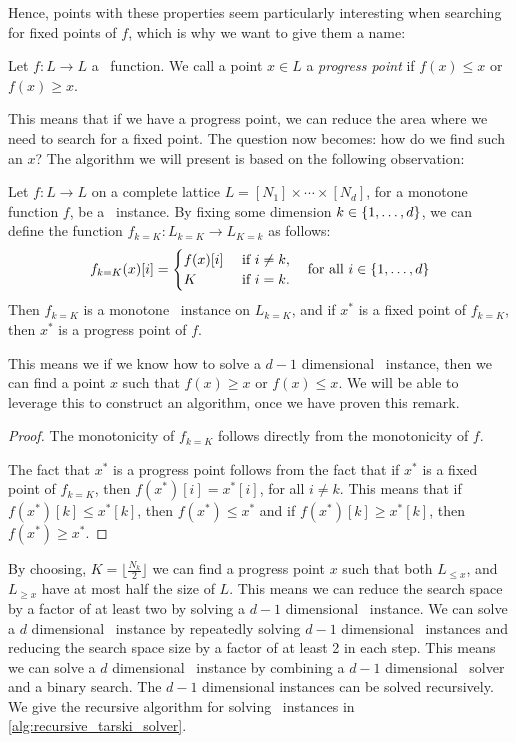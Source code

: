 Hence, points with these properties seem particularly interesting when searching for fixed points of $f$, which is why we want to give them a name:
\begin{definition}
	Let $f : L \rightarrow L$ a \Tarski\ function. We call a point $x \in L$ a \emph{progress point} if $f(x) \leq x$ or $f(x) \geq x$.
\end{definition}
This means that if we have a progress point, we can reduce the area where we need to search for a fixed point. The question now becomes: how do we find such an $x$? The algorithm we will present is based on the following observation:
\begin{remark}
	Let $f : L \rightarrow L$ on a complete lattice ${L = [N_1] \times \cdots \times [N_d]}$, for a monotone function $f$, be a \Tarski\ instance. By fixing some dimension ${k \in \left\{1, \dots, d\right\}}$, we can define the function ${f_{k=K} : L_{k=K} \rightarrow L_{K=k}}$ as follows:
	\begin{align*}
		f_{k=K}(x)[i] = \begin{cases}
			                f(x)[i] & \text{ if } i \neq k, \\
			                K       & \text{ if } i = k.
		                \end{cases} \quad \text{for all $i \in \left\{1, \dots, d\right\}$}
	\end{align*}
	Then $f_{k=K}$ is a monotone \Tarski\ instance on $L_{k=K}$, and if $x^*$ is a fixed point of $f_{k=K}$, then $x^*$ is a progress point of $f$.
\end{remark}
This means we if we know how to solve a $d-1$ dimensional \Tarski\ instance, then we can find a point $x$ such that $f(x) \geq x$ or $f(x) \leq x$. We will be able to leverage this to construct an algorithm, once we have proven this remark.
\begin{proof}
	The monotonicity of $f_{k=K}$ follows directly from the monotonicity of $f$. \par
	The fact that $x^*$ is a progress point follows from the fact that if $x^*$ is a fixed point of $f_{k=K}$, then $f(x^*)[i] = x^*[i]$, for all $i \neq k$. This means that if $f(x^*)[k] \leq x^*[k]$, then $f(x^*) \leq x^*$ and if $f(x^*)[k] \geq x^*[k]$, then $f(x^*) \geq x^*$.
\end{proof}
By choosing, $K = \lfloor \frac{N_k}{2} \rfloor$ we can find a progress point $x$ such that both $L_{\leq x}$, and $L_{\geq x}$ have at most half the size of $L$. This means we can reduce the search space by a factor of at least two by solving a $d-1$ dimensional \Tarski\ instance. We can solve a $d$ dimensional \Tarski\ instance by repeatedly solving $d-1$ dimensional \Tarski\ instances and reducing the search space size by a factor of at least 2 in each step. This means we can solve a $d$ dimensional \Tarski\ instance by combining a $d-1$ dimensional \Tarski\ solver and a binary search. The $d-1$ dimensional instances can be solved recursively. We give the recursive algorithm for solving \Tarski\ instances in \cref{alg:recursive_tarski_solver}.
